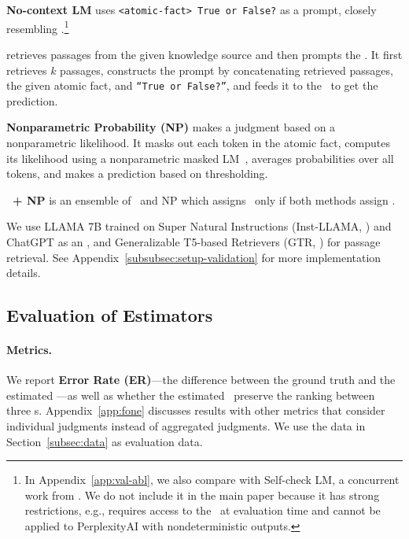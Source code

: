 \vspace{.3em}
\noindent 
\textbf{No-context LM} uses \texttt{<atomic-fact> True or False?} as a prompt, closely resembling \citet{kadavath2022language}.\footnote{In Appendix~\ref{app:val-abl}, we also compare with Self-check LM, a concurrent work from \citet{manakul2023selfcheckgpt}. We do not include it in the main paper because it has strong restrictions, e.g., requires access to the \subjectLM\ at evaluation time and cannot be applied to PerplexityAI with nondeterministic outputs. %
}%


\vspace{.3em}
\noindent \textbf{\rtg} retrieves passages from the given knowledge source and then prompts the \evalLM. It first retrieves $k$ passages, constructs the prompt by concatenating retrieved passages, the given atomic fact, and \texttt{``True or False?''}, and feeds it to the \evalLM\ to get the prediction.

\vspace{.3em}
\noindent \textbf{Nonparametric Probability (NP)} makes a judgment based on a nonparametric likelihood. 
It masks out each token in the atomic fact, computes its likelihood using a nonparametric masked LM~\citep{min2022nonparametric}, averages probabilities over all tokens, and makes a prediction based on thresholding.

\vspace{.3em}
\noindent \textbf{\rtg\ + NP} is an ensemble of \rtg\ and NP which assigns \sLabel\ only if both methods assign \sLabel. %

\vspace{.3em}
We use LLAMA 7B trained on Super Natural Instructions (Inst-LLAMA, \citealp{touvron2023llama,wang2022super}) and ChatGPT as an \evalLM, and Generalizable T5-based Retrievers (GTR, \citet{ni2021large}) for passage retrieval.
See Appendix~\ref{subsubsec:setup-validation} for more implementation details.

\subsection{Evaluation of Estimators}\label{subsec:models-validation-result}

\paragraph{Metrics.}
We report \textbf{Error Rate (ER)}---the difference between the ground truth and the estimated \ours---as well as whether the estimated \ourScores\ preserve the ranking between three \subjectLM{}s.
Appendix~\ref{app:fone} discusses results with other metrics that consider individual judgments instead of aggregated judgments.
We use the data in Section~\ref{subsec:data} as evaluation data.

